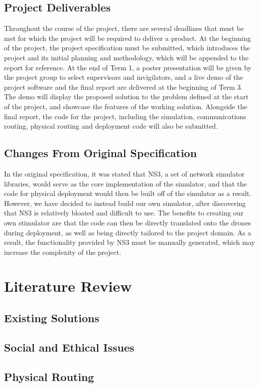 \documentclass[12pt,a4paper,twoside]{report}
\begin{document}
	\section{Project Deliverables}
	Throughout the course of the project, there are several deadlines that must be met for which the project will be required to deliver a product. At the beginning of the project, the project specification must be submitted, which introduces the project and its initial planning and methodology, which will be appended to the report for reference. At the end of Term 1, a poster presentation will be given by the project group to select supervisors and invigilators, and a live demo of the project software and the final report are delivered at the beginning of Term 3. The demo will display the proposed solution to the problem defined at the start of the project, and showcase the features of the working solution. Alongside the final report, the code for the project, including the simulation, communications routing, physical routing and deployment code will also be submitted.
	\section{Changes From Original Specification}
	In the original specification, it was stated that NS3, a set of network simulator libraries, would serve as the core implementation of the simulator, and that the code for physical deployment would then be built off of the simulator as a result. However, we have decided to instead build our own simulator, after discovering that NS3 is relatively bloated and difficult to use. The benefits to creating our own stimulator are that the code can then be directly translated onto the drones during deployment, as well as being directly tailored to the project domain. As a result, the functionality provided by NS3 must be manually generated, which may increase the complexity of the project. 

\chapter{Literature Review}
	\section{Existing Solutions}
	\section{Social and Ethical Issues}
	\section{Physical Routing}
\end{document}
